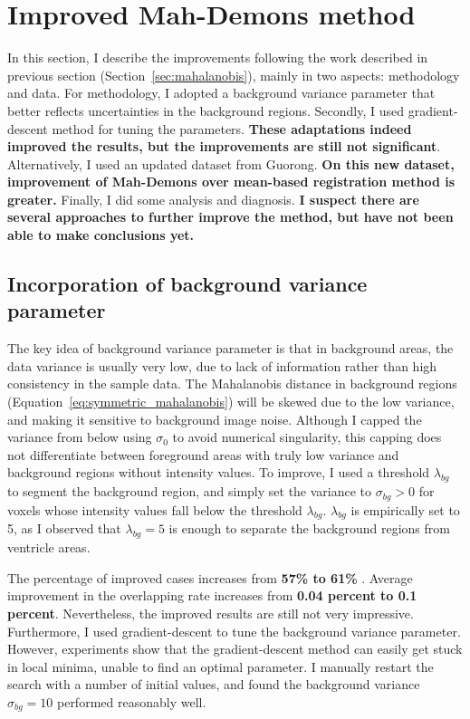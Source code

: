 \documentclass[preprint,review,12pt]{elsarticle}
\begin{document}
\section{Improved Mah-Demons method}
\label{sec:improved}
In this section, I describe the improvements following the work described in previous section (Section~\ref{sec:mahalanobis}), mainly in two aspects: methodology and data. For methodology, I adopted a background variance parameter that better reflects uncertainties in the background regions. Secondly, I used gradient-descent method for tuning the parameters. {\bf These adaptations indeed improved the results, but the improvements are still not significant}. Alternatively, I used an updated dataset from Guorong.  {\bf On this new dataset, improvement of Mah-Demons over mean-based registration method is greater.} Finally, I did some analysis and diagnosis. {\bf I suspect there are several approaches to further improve the method,  but have not been able to make conclusions yet.}

\subsection{Incorporation of background variance parameter}
The key idea of background variance parameter is that in background areas, the data variance is usually very low, due to lack of information rather than high consistency in the sample data. The Mahalanobis distance in background regions (Equation~\ref{eq:symmetric_mahalanobis}) will be skewed due to the low variance, and making it sensitive to background image noise. Although I capped the variance from below using $\sigma_0$ to avoid numerical singularity, this capping does not differentiate between foreground areas with truly low variance and background regions without intensity values. To improve, I used a threshold $\lambda_{bg}$ to segment the background region, and simply set the variance to $\sigma_{bg} >0$ for voxels whose intensity values fall below the threshold $\lambda_{bg}$. $\lambda_{bg}$ is empirically set to 5, as I observed that $\lambda_{bg}=5$ is enough to separate the background regions from ventricle areas.

The percentage of improved cases increases from {\bf 57\% to 61\% }. Average improvement in the overlapping rate increases from {\bf 0.04 percent to 0.1 percent}. Nevertheless, the improved results are still not very impressive. Furthermore, I used gradient-descent to tune the background variance parameter. However, experiments show that the gradient-descent method can easily get stuck in local minima, unable to find an optimal parameter. I manually restart the search with a number of initial values, and found the background variance $\sigma_{bg}=10$ performed reasonably well.
\end{document}
